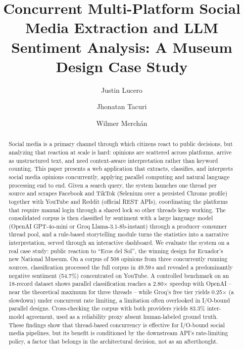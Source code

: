 \documentclass[runningheads]{llncs}
\begin{document}
\title{Concurrent Multi-Platform Social Media Extraction and LLM Sentiment Analysis: A Museum Design Case Study}

\author{Justin Lucero \and Jhonatan Tacuri \and Wilmer Merch\'an}



\maketitle

\begin{abstract}
Social media is a primary channel through which citizens react to public
decisions, but analyzing that reaction at scale is hard: opinions are
scattered across platforms, arrive as unstructured text, and need
context-aware interpretation rather than keyword counting. This paper
presents a web application that extracts, classifies, and interprets social
media opinions concurrently, applying parallel computing and natural
language processing end to end. Given a search query, the system launches
one thread per source and scrapes Facebook and TikTok (Selenium over a
persisted Chrome profile) together with YouTube and Reddit (official REST
APIs), coordinating the platforms that require manual login through a
shared lock so other threads keep working. The consolidated corpus is then
classified by sentiment with a large language model (OpenAI GPT-4o-mini or
Groq Llama-3.1-8b-instant) through a producer--consumer thread pool, and a
rule-based storytelling module turns the statistics into a narrative
interpretation, served through an interactive dashboard. We evaluate the
system on a real case study: public reaction to ``Ecos del Sol'', the
winning design for Ecuador's new National Museum. On a corpus of
508 opinions from three concurrently running sources, classification
processed the full corpus in 49.59\,s and revealed a predominantly negative
sentiment (54.7\%) concentrated on YouTube. A controlled benchmark on an
18-record dataset shows parallel classification reaches a 2.80$\times$
speedup with OpenAI -- near the theoretical maximum for three threads --
while Groq's free tier yields 0.25$\times$ (a slowdown) under concurrent
rate limiting, a limitation often overlooked in I/O-bound parallel designs.
Cross-checking the corpus with both providers yields 83.3\% inter-model
agreement, used as a reliability proxy absent human-labeled ground truth.
These findings show that thread-based concurrency is effective for
I/O-bound social media pipelines, but its benefit is conditioned by the
downstream API's rate-limiting policy, a factor that belongs in the
architectural decision, not as an afterthought.

\end{abstract}
\end{document}
